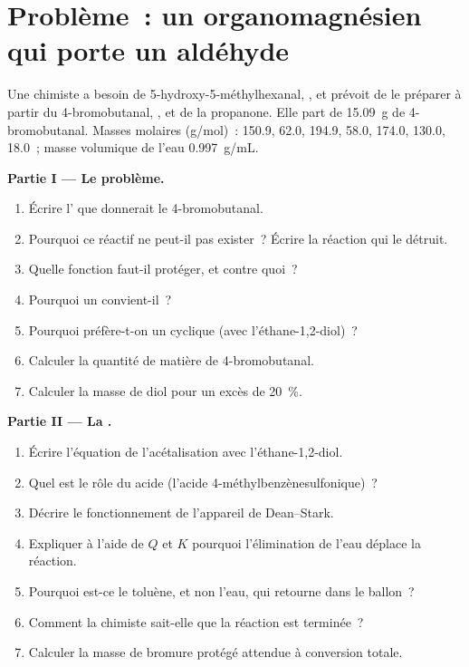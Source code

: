 \section{Problème~: un organomagnésien qui porte un aldéhyde}

\begin{problem}
\label{pb:b1:acetals-protection:1}
Une chimiste a besoin de 5-hydroxy-5-méthylhexanal,
, et prévoit de le préparer à partir du
4-bromobutanal, , et de la propanone.
Elle part de \qty{15.09}{g} de 4-bromobutanal. Masses molaires
(\unit{g/mol})~:  150.9,  62.0,  194.9,
 58.0,  174.0,  130.0,  18.0~;
masse volumique de l'eau \qty{0.997}{g/mL}.

\medskip
\noindent\textbf{Partie I --- Le problème.}
\begin{enumerate}
  \item Écrire l' que donnerait le 4-bromobutanal.
  \item Pourquoi ce réactif ne peut-il pas exister~? Écrire la réaction
        qui le détruit.
  \item Quelle fonction faut-il protéger, et contre quoi~?
  \item Pourquoi un  convient-il~?
  \item Pourquoi préfère-t-on un  cyclique (avec
        l'éthane-1,2-diol)~?
  \item Calculer la quantité de matière de 4-bromobutanal.
  \item Calculer la masse de diol pour un excès de \qty{20}{\percent}.
\end{enumerate}

\medskip
\noindent\textbf{Partie II --- La .}
\begin{enumerate}[resume]
  \item Écrire l'équation de l'acétalisation avec l'éthane-1,2-diol.
  \item Quel est le rôle du  acide (l'acide
        4-méthylbenzènesulfonique)~?
  \item Décrire le fonctionnement de l'appareil de Dean--Stark.
  \item Expliquer à l'aide de $Q$ et $K$ pourquoi l'élimination de l'eau
        déplace la réaction.
  \item Pourquoi est-ce le toluène, et non l'eau, qui retourne dans le
        ballon~?
  \item Comment la chimiste sait-elle que la réaction est terminée~?
  \item Calculer la masse de bromure protégé attendue à conversion
        totale.
\end{enumerate}


\end{problem}
